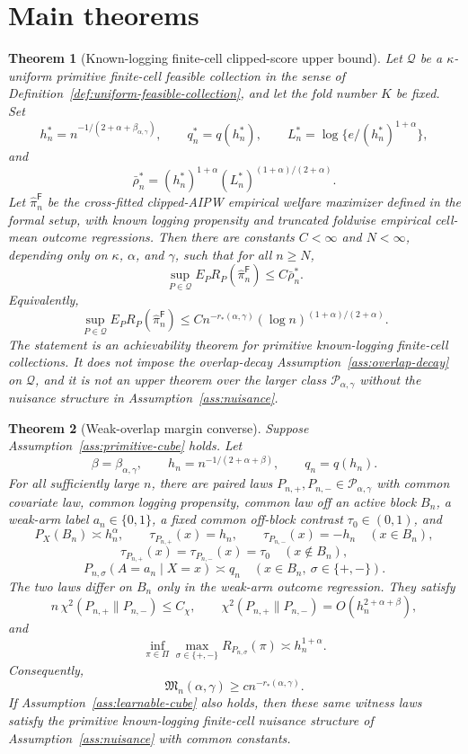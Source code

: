 \documentclass[11pt]{article}
\theoremstyle{definition}
\theoremstyle{plain}
\newtheorem{theorem}{Theorem}
\theoremstyle{remark}
\begin{document}
\section{Main theorems}
\begin{theorem}[Known-logging finite-cell clipped-score upper bound]\label{thm:feasible-upper-log}\label{conj:upper-rate}
Let \(\mathcal Q\) be a \(\kappa\)-uniform primitive finite-cell feasible
collection in the sense of Definition~\ref{def:uniform-feasible-collection},
and let the fold number \(K\) be fixed.  Set
\[
h_n^*=n^{-1/(2+\alpha+\beta_{\alpha,\gamma})},
\qquad q_n^*=q(h_n^*),
\qquad
L_n^*=\log\{e/(h_n^*)^{1+\alpha}\},
\]
and
\[
\bar\rho_n^*
=
(h_n^*)^{1+\alpha}(L_n^*)^{(1+\alpha)/(2+\alpha)}.
\]
Let \(\widehat\pi_n^{\mathsf F}\) be the cross-fitted clipped-AIPW empirical
welfare maximizer defined in the formal setup, with known logging propensity
and truncated foldwise empirical cell-mean outcome regressions.  Then there
are constants \(C<\infty\) and \(N<\infty\), depending only on \(\kappa\),
\(\alpha\), and \(\gamma\), such that for all \(n\ge N\),
\[
\sup_{P\in\mathcal Q}
E_P R_P(\widehat\pi_n^{\mathsf F})
\le
C\bar\rho_n^*.
\]
Equivalently,
\[
\sup_{P\in\mathcal Q}
E_P R_P(\widehat\pi_n^{\mathsf F})
\le
C n^{-r_*(\alpha,\gamma)}
(\log n)^{(1+\alpha)/(2+\alpha)}.
\]
The statement is an achievability theorem for primitive known-logging
finite-cell collections.  It does not impose the overlap-decay
Assumption~\ref{ass:overlap-decay} on \(\mathcal Q\), and it is not an upper
theorem over the larger class \(\mathcal P_{\alpha,\gamma}\) without the
nuisance structure in Assumption~\ref{ass:nuisance}.
\end{theorem}

\begin{theorem}[Weak-overlap margin converse]\label{thm:lower-full-class}\label{conj:lower-calibration}
Suppose Assumption~\ref{ass:primitive-cube} holds.  Let
\[
\beta=\beta_{\alpha,\gamma},\qquad
h_n=n^{-1/(2+\alpha+\beta)},\qquad
q_n=q(h_n).
\]
For all sufficiently large \(n\), there are paired laws
\(P_{n,+},P_{n,-}\in\mathcal P_{\alpha,\gamma}\) with common covariate law,
common logging propensity, common law off an active block \(B_n\), a weak-arm
label \(a_n\in\{0,1\}\), a fixed common off-block contrast \(\tau_0\in(0,1)\),
and
\[
P_X(B_n)\asymp h_n^\alpha,\qquad
\tau_{P_{n,+}}(x)=h_n,\qquad
\tau_{P_{n,-}}(x)=-h_n
\quad (x\in B_n),
\]
\[
\tau_{P_{n,+}}(x)=\tau_{P_{n,-}}(x)=\tau_0
\quad (x\notin B_n),
\]
\[
P_{n,\sigma}(A=a_n\mid X=x)\asymp q_n
\quad (x\in B_n,\ \sigma\in\{+,-\}).
\]
The two laws differ on \(B_n\) only in the weak-arm outcome regression.  They
satisfy
\[
n\,\chi^2(P_{n,+}\|P_{n,-})\le C_\chi,
\qquad
\chi^2(P_{n,+}\|P_{n,-})=O(h_n^{2+\alpha+\beta}),
\]
and
\[
\inf_{\pi\in\Pi}
\max_{\sigma\in\{+,-\}}R_{P_{n,\sigma}}(\pi)
\asymp h_n^{1+\alpha}.
\]
Consequently,
\[
\mathfrak M_n(\alpha,\gamma)\ge c n^{-r_*(\alpha,\gamma)}.
\]
If Assumption~\ref{ass:learnable-cube} also holds, then these same witness
laws satisfy the primitive known-logging finite-cell nuisance structure of
Assumption~\ref{ass:nuisance} with common constants.
\end{theorem}
\end{document}
